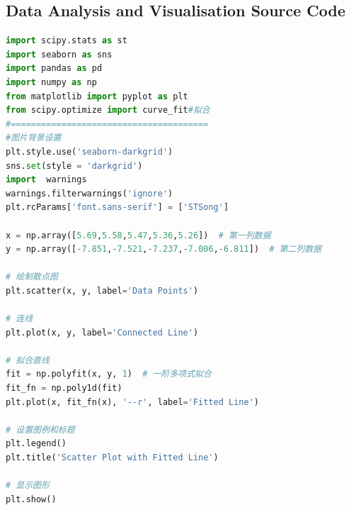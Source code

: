 \documentclass[UTF8]{article}
\begin{document}
\begin{appendix}
	\section{Data Analysis and Visualisation Source Code}
	\begin{lstlisting}[language=python]
import scipy.stats as st
import seaborn as sns
import pandas as pd
import numpy as np
from matplotlib import pyplot as plt
from scipy.optimize import curve_fit#拟合
#=======================================
#图片背景设置
plt.style.use('seaborn-darkgrid')
sns.set(style = 'darkgrid')
import  warnings
warnings.filterwarnings('ignore')
plt.rcParams['font.sans-serif'] = ['STSong']

x = np.array([5.69,5.58,5.47,5.36,5.26])  # 第一列数据
y = np.array([-7.851,-7.521,-7.237,-7.006,-6.811])  # 第二列数据

# 绘制散点图
plt.scatter(x, y, label='Data Points')

# 连线
plt.plot(x, y, label='Connected Line')

# 拟合直线
fit = np.polyfit(x, y, 1)  # 一阶多项式拟合
fit_fn = np.poly1d(fit)
plt.plot(x, fit_fn(x), '--r', label='Fitted Line')

# 设置图例和标题
plt.legend()
plt.title('Scatter Plot with Fitted Line')

# 显示图形
plt.show()
	\end{lstlisting}

\end{appendix}
\end{document}
